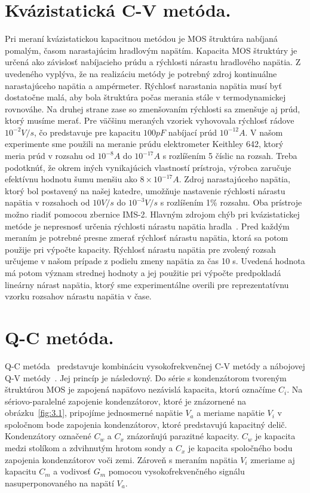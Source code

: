 \section{Kvázistatická C-V metóda.}\label{sec:3.2}

Pri meraní kvázistatickou kapacitnou metódou je MOS štruktúra nabíjaná
pomalým, časom narastajúcim hradlovým napätím. Kapacita MOS štruktúry
je určená ako závislosť nabíjacieho prúdu a rýchlosti nárastu
hradlového napätia.  Z uvedeného vyplýva, že na realizáciu metódy je
potrebný zdroj kontinuálne narastajúceho napätia a
ampérmeter. Rýchlosť narastania napätia musí byť dostatočne malá, aby
bola štruktúra počas merania stále v termodynamickej rovnováhe. Na
druhej strane zase so zmenšovaním rýchlosti sa zmenšuje aj prúd, ktorý
musíme merať. Pre väčšinu meraných vzoriek vyhovovala rýchlosť rádove
$10^{-2}V/s$, čo predstavuje pre kapacitu $100pF$ nabíjací prúd
$10^{-12}A$. V našom experimente sme použili na meranie prúdu
elektrometer Keithley 642, ktorý meria prúd v rozsahu od $10^{-8}A$ do
$10^{-17}A$ s rozlíšením 5 číslic na rozsah.  Treba podotknúť, že
okrem iných vynikajúcich vlastností prístroja, výrobca zaručuje
efektívnu hodnotu šumu menšiu ako $8\times10^{-17}A$. Zdroj
narastajúceho napätia, ktorý bol postavený na našej katedre, umožňuje
nastavenie rýchlosti nárastu napätia v rozsahoch od $10V/s$ do
$10^{-3}V/s$ s rozlíšením 1\% rozsahu. Oba prístroje možno riadiť
pomocou zbernice IMS-2.  Hlavným zdrojom chýb pri kvázistatickej
metóde je nepresnosť určenia rýchlosti nárastu napätia
hradla~\cite{1.5}. Pred každým meraním je potrebné presne zmerať
rýchlosť nárastu napätia, ktorá sa potom použije pri výpočte
kapacity. Rýchlosť nárastu napätia pre zvolený rozsah určujeme v našom
prípade z podielu zmeny napätia za čas 10 s. Uvedená hodnota má potom
význam strednej hodnoty a jej použitie pri výpočte predpokladá
lineárny nárast napätia, ktorý sme experimentálne overili pre
reprezentatívnu vzorku rozsahov nárastu napätia v čase.

\section{Q-C metóda.}\label{sec:3.3}

Q-C metóda~\cite{3.4} predstavuje kombináciu vysokofrekvenčnej C-V
metódy a nábojovej Q-V metódy~\cite{3.5}. Jej princíp je následovný. Do
série s kondenzátorom tvoreným štruktúrou MOS je zapojená napäťovo
nezávislá kapacita, ktorú označíme $C_i$. Na sériovo-paralelné
zapojenie kondenzátorov, ktoré je znázornené na obrázku~\ref{fig:3.1},
pripojíme jednosmerné napätie $V_a$ a meriame napätie $V_i$ v
spoločnom bode zapojenia kondenzátorov, ktoré predstavujú kapacitný
delič. Kondenzátory označené $C_w$ a $C_x$ znázorňujú parazitné
kapacity. $C_w$ je kapacita medzi stolíkom a zdvihnutým hrotom sondy a
$C_x$ je kapacita spoločného bodu zapojenia kondenzátorov voči
zemi. Zároveň s meraním napätia $V_i$ zmeriame aj kapacitu $C_m$ a
vodivosť $G_m$ pomocou vysokofrekvenčného signálu nasuperponovaného na
napätí $V_a$.

